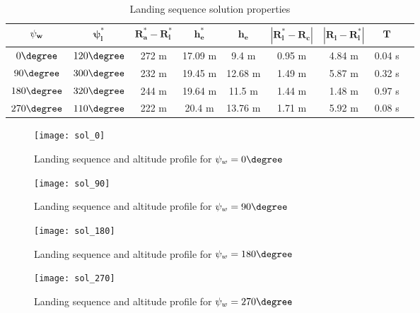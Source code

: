 \begin{table}[H]
    \begin{center}
        \begin{tabular}{|c|c|c|c|c|c|c|c|c|}
            \hline
            $\mathbf{\psi_w}$ & $\mathbf{\psi_l^*}$ & $\mathbf{R_a^*-R_l^*}$ & $\mathbf{h_e^*}$ & $\mathbf{h_e}$ & $\mathbf{|R_l^*-R_c|}$ & $\mathbf{|R_l-R_l^*|}$ & $\mathbf{T}$\\
            \hline
            $0\degree$ & $120\degree$ & 272 m & 17.09 m & 9.4 m & 0.95 m & 4.84 m & 0.04 s \\
            \hline
            $90\degree$ & $300\degree$ & 232 m & 19.45 m & 12.68 m & 1.49 m & 5.87 m & 0.32 s \\
            \hline
            $180\degree$ & $320\degree$ & 244 m & 19.64 m & 11.5 m & 1.44 m & 1.48 m & 0.97 s \\
            \hline
            $270\degree$ & $110\degree$ & 222 m & 20.4 m & 13.76 m & 1.71 m & 5.92 m & 0.08 s \\
            \hline
        \end{tabular}
    \end{center}
    \caption{Landing sequence solution properties}
    \label{tab:opt_land_param}
\end{table}

\begin{figure}[H]
    \hspace{-0.15\textwidth}
    \texttt{[image: sol\_0]}
    \caption{Landing sequence and altitude profile for $\winddir=0\degree$}
    \label{fig:sim_sol_0}
\end{figure}

\begin{figure}[H]
    \hspace{-0.15\textwidth}
    \texttt{[image: sol\_90]}
    \caption{Landing sequence and altitude profile for $\winddir=90\degree$}
\end{figure}

\begin{figure}[H]
    \hspace{-0.15\textwidth}
    \texttt{[image: sol\_180]}
    \caption{Landing sequence and altitude profile for $\winddir=180\degree$}
\end{figure}

\begin{figure}[H]
    \hspace{-0.15\textwidth}
    \texttt{[image: sol\_270]}
    \caption{Landing sequence and altitude profile for $\winddir=270\degree$}
    \label{fig:sim_sol_270}
\end{figure}

